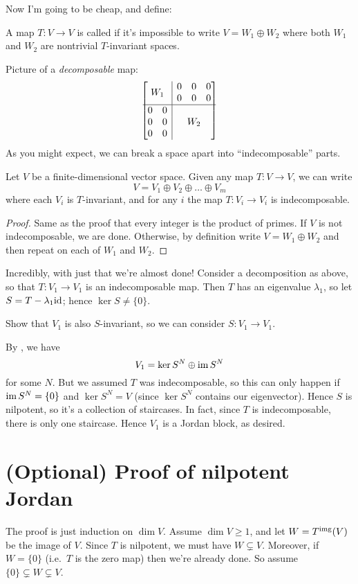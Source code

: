 Now I'm going to be cheap, and define:
\begin{definition}
	A map $T \colon V \to V$ is called 
	if it's impossible to write $V = W_1 \oplus W_2$
	where both $W_1$ and $W_2$ are nontrivial $T$-invariant spaces.
\end{definition}
Picture of a \emph{decomposable} map:
\[ 
	\begin{bmatrix}
		\multicolumn{2}{c|}{\multirow{2}{*}{$W_1$}} & 0 & 0 & 0  \\
		\multicolumn{2}{c|}{} & 0 & 0 & 0 \\ \hline
		0 & 0 & \multicolumn{3}{|c}{\multirow{3}{*}{$W_2$}} \\
		0 & 0 & \multicolumn{3}{|c}{} \\
		0 & 0 & \multicolumn{3}{|c}{}
	\end{bmatrix}
\]
As you might expect, we can break a space apart into ``indecomposable'' parts.
\begin{proposition}
	Let $V$ be a finite-dimensional vector space.
	Given any map $T \colon V \to V$, we can write
	\[ V = V_1 \oplus V_2 \oplus \dots \oplus V_m \]
	where each $V_i$ is $T$-invariant,
	and for any $i$ the map $T \colon V_i \to V_i$ is indecomposable.
\end{proposition}
\begin{proof}
	Same as the proof that every integer is the product of primes.
	If $V$ is not indecomposable, we are done.
	Otherwise, by definition write $V = W_1 \oplus W_2$
	and then repeat on each of $W_1$ and $W_2$.
\end{proof}

Incredibly, with just that we're almost done!
Consider a decomposition as above,
so that $T \colon V_1 \to V_1$ is an indecomposable map.
Then $T$ has an eigenvalue $\lambda_1$, so let $S = T - \lambda_1 \mathrm{id}$; hence $\ker S \neq \{0\}$.
\begin{ques}
	Show that $V_1$ is also $S$-invariant, so we can consider $S : V_1 \to V_1$.
\end{ques}
By , we have
\[ V_1 = \ker S^N \oplus \operatorname{im} S^N \]
for some $N$.
But we assumed $T$ was indecomposable,
so this can only happen if $\operatorname{im} S^N = \{0\}$ and $\ker S^N = V$
(since $\ker S^N$ contains our eigenvector).
Hence $S$ is nilpotent, so it's a collection of staircases.
In fact, since $T$ is indecomposable, there is only one staircase.
Hence $V_1$ is a Jordan block, as desired.

\section{(Optional) Proof of nilpotent Jordan}
The proof is just induction on $\dim V$.
Assume $\dim V \ge 1$, and let $W = T^{\text{img}}(V)$ be the image of $V$.
Since $T$ is nilpotent, we must have $W \subsetneq V$.
Moreover, if $W = \{0\}$ (i.e.\ $T$ is the zero map) then we're already done.
So assume $\{0\} \subsetneq W \subsetneq V$.

